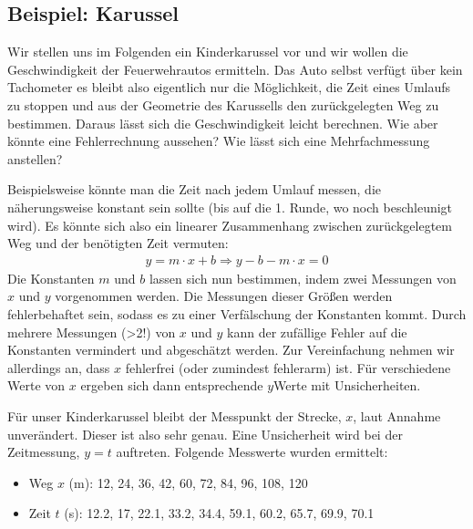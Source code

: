 \documentclass[letterpaper,10pt,english]{jupyterBook}
\begin{document}
\subsection{Beispiel: Karussel }
\label{\detokenize{content/1_Kurvenanpassung:beispiel-karussel-a-id-sec-beispiel-a}}
\sphinxAtStartPar
Wir stellen uns im Folgenden ein Kinderkarussel vor und wir wollen die Geschwindigkeit der Feuerwehrautos ermitteln. Das Auto selbst verfügt über kein Tachometer \sphinxhyphen{} es bleibt also eigentlich nur die Möglichkeit, die Zeit eines Umlaufs zu stoppen und aus der Geometrie des Karussells den zurückgelegten Weg zu bestimmen. Daraus lässt sich die Geschwindigkeit leicht berechnen.
Wie aber könnte eine Fehlerrechnung aussehen? Wie lässt sich eine Mehrfachmessung anstellen?

\sphinxAtStartPar
Beispielsweise könnte man die Zeit nach jedem Umlauf messen, die näherungsweise konstant sein sollte (bis auf die 1. Runde, wo noch beschleunigt wird). Es könnte sich also ein linearer Zusammenhang zwischen zurückgelegtem Weg und der benötigten Zeit vermuten:
\begin{equation*}
\begin{split}y = m\cdot x + b \Rightarrow y - b - m\cdot x = 0\end{split}
\end{equation*}
\sphinxAtStartPar
Die Konstanten \(m\) und \(b\) lassen sich nun bestimmen, indem  zwei Messungen von \(x\) und \(y\) vorgenommen werden. Die Messungen dieser Größen werden fehlerbehaftet sein, sodass es zu einer Verfälschung der Konstanten kommt. Durch mehrere Messungen (>2!) von \(x\) und \(y\) kann der zufällige Fehler auf die Konstanten vermindert und abgeschätzt werden. Zur Vereinfachung nehmen wir allerdings an, dass \(x\) fehlerfrei (oder zumindest fehlerarm) ist. Für verschiedene Werte von \(x\) ergeben sich dann entsprechende \(y\)\sphinxhyphen{}Werte mit Unsicherheiten.

\sphinxAtStartPar
Für unser Kinderkarussel bleibt der Messpunkt der Strecke, \(x\), laut Annahme unverändert. Dieser ist also sehr genau. Eine Unsicherheit wird bei der Zeitmessung, \(y = t\) auftreten. Folgende Messwerte wurden ermittelt:
\begin{itemize}
\item {} 
\sphinxAtStartPar
Weg  \(x\) (m): 12, 24, 36, 42, 60, 72, 84, 96, 108, 120

\item {} 
\sphinxAtStartPar
Zeit \(t\) (s): 12.2, 17, 22.1, 33.2, 34.4, 59.1, 60.2, 65.7, 69.9, 70.1

\end{itemize}
\end{document}
